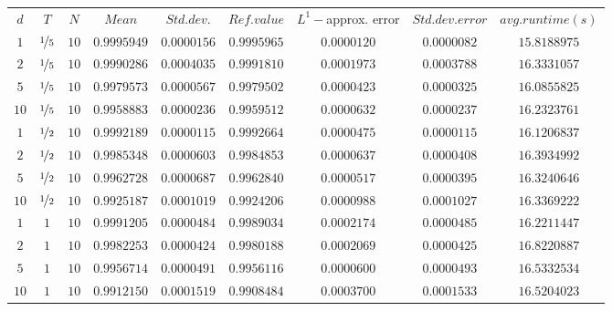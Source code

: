 \begin{tabular}{ccccccccc}
$d$ & $T$ & $N$ & $Mean$ & $Std. dev.$ & $Ref. value$ & $L^1-$approx. error & $Std. dev. error$ & $avg. runtime (s)$\\
$1$ & $\nicefrac{1}{5}$ & $10$ & $0.9995949$ & $0.0000156$ & $0.9995965$ & $0.0000120$ & $0.0000082$ & $15.8188975$\\
$2$ & $\nicefrac{1}{5}$ & $10$ & $0.9990286$ & $0.0004035$ & $0.9991810$ & $0.0001973$ & $0.0003788$ & $16.3331057$\\
$5$ & $\nicefrac{1}{5}$ & $10$ & $0.9979573$ & $0.0000567$ & $0.9979502$ & $0.0000423$ & $0.0000325$ & $16.0855825$\\
$10$ & $\nicefrac{1}{5}$ & $10$ & $0.9958883$ & $0.0000236$ & $0.9959512$ & $0.0000632$ & $0.0000237$ & $16.2323761$\\
$1$ & $\nicefrac{1}{2}$ & $10$ & $0.9992189$ & $0.0000115$ & $0.9992664$ & $0.0000475$ & $0.0000115$ & $16.1206837$\\
$2$ & $\nicefrac{1}{2}$ & $10$ & $0.9985348$ & $0.0000603$ & $0.9984853$ & $0.0000637$ & $0.0000408$ & $16.3934992$\\
$5$ & $\nicefrac{1}{2}$ & $10$ & $0.9962728$ & $0.0000687$ & $0.9962840$ & $0.0000517$ & $0.0000395$ & $16.3240646$\\
$10$ & $\nicefrac{1}{2}$ & $10$ & $0.9925187$ & $0.0001019$ & $0.9924206$ & $0.0000988$ & $0.0001027$ & $16.3369222$\\
$1$ & $1$ & $10$ & $0.9991205$ & $0.0000484$ & $0.9989034$ & $0.0002174$ & $0.0000485$ & $16.2211447$\\
$2$ & $1$ & $10$ & $0.9982253$ & $0.0000424$ & $0.9980188$ & $0.0002069$ & $0.0000425$ & $16.8220887$\\
$5$ & $1$ & $10$ & $0.9956714$ & $0.0000491$ & $0.9956116$ & $0.0000600$ & $0.0000493$ & $16.5332534$\\
$10$ & $1$ & $10$ & $0.9912150$ & $0.0001519$ & $0.9908484$ & $0.0003700$ & $0.0001533$ & $16.5204023$\\
\end{tabular}
